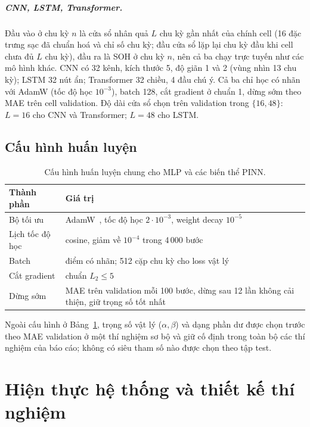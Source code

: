 \documentclass[12pt,a4paper,oneside]{report}
\theoremstyle{plain}
\theoremstyle{definition}
\begin{document}
\paragraph{CNN, LSTM, Transformer.} Đầu vào ở chu kỳ $n$ là cửa sổ nhân quả $L$ chu kỳ gần nhất của chính cell (16 đặc
trưng sạc đã chuẩn hoá và chỉ số chu kỳ; đầu cửa sổ lặp lại chu kỳ đầu khi cell chưa đủ $L$ chu kỳ), đầu ra là SOH ở
chu kỳ $n$, nên cả ba chạy trực tuyến như các mô hình khác. CNN có 32 kênh, kích thước 5, độ giãn 1 và 2 (vùng nhìn 13
chu kỳ); LSTM 32 nút ẩn; Transformer 32 chiều, 4 đầu chú ý. Cả ba chỉ học có nhãn với AdamW (tốc độ học $10^{-3}$),
batch 128, cắt gradient ở chuẩn 1, dừng sớm theo MAE trên cell validation. Độ dài cửa sổ chọn trên validation trong
$\{16, 48\}$: $L = 16$ cho CNN và Transformer; $L = 48$ cho LSTM.
\section{Cấu hình huấn luyện}

\begin{table}[!htbp]\centering\small
\caption{Cấu hình huấn luyện chung cho MLP và các biến thể PINN.}\label{tab:train}
\begin{tabularx}{\textwidth}{l>{\raggedright\arraybackslash}X}\toprule
Thành phần & Giá trị \\\midrule
Bộ tối ưu & AdamW~\cite{loshchilov2019}, tốc độ học $2\cdot10^{-3}$, weight decay $10^{-5}$ \\
Lịch tốc độ học & cosine, giảm về $10^{-4}$ trong 4\,000 bước \\
Batch & 512 điểm có nhãn; 512 cặp chu kỳ cho loss vật lý \\
Cắt gradient & chuẩn $L_2 \le 5$ \\
Dừng sớm & MAE trên validation mỗi 100 bước, dừng sau 12 lần không cải thiện, giữ trọng số tốt nhất \\
\bottomrule\end{tabularx}\end{table}

Ngoài cấu hình ở Bảng~\ref{tab:train}, trọng số vật lý ($\alpha, \beta$) và dạng phần dư được chọn trước theo MAE validation ở một thí nghiệm sơ bộ
và giữ cố định trong toàn bộ các thí nghiệm của báo cáo; không có siêu tham số nào được chọn theo tập test.

\chapter{Hiện thực hệ thống và thiết kế thí nghiệm}\label{ch:thietke}
\end{document}
